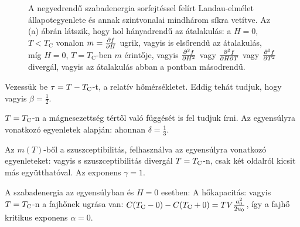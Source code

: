 \begin{figure}[ht!]
   \caption{A negyedrendű szabadenergia sorfejtéssel felírt Landau-elmélet  állapotegyenlete és annak szintvonalai mindhárom síkra vetítve. Az (a) ábrán látszik, hogy hol hányadrendű az átalakulás: a $H=0$, $T<T_\text{C}$ vonalon $m=\frac{\partial f}{\partial H}$ ugrik, vagyis is elsőrendű az átalakulás, míg $H=0$, $T=T_\text{C}$-ben $m$ érintője, vagyis $\frac{\partial ^2 f}{\partial H^2}$ vagy $\frac{\partial ^2 f}{\partial H\partial T}$ vagy $\frac{\partial ^2 f}{\partial T^2}$ divergál, vagyis az átalakulás abban a pontban másodrendű.}\label{fig:B10-landau}
  \end{figure}
  
  Vezessük be $\tau=T-T_\text{C}$-t, a relatív hőmérsékletet.
  Eddig tehát tudjuk, hogy
  vagyis $\beta=\frac{1}{2}$.
  
  $T=T_\text{C}$-n a mágnesezettség tértől való függését is fel tudjuk írni. Az egyensúlyra vonatkozó egyenletek alapján:
  ahonnan $\delta=\frac{1}{3}$.
  
  Az $m(T)$-ből a szuszceptibilitás, felhasználva az egyensúlyra vonatkozó egyenleteket:
  vagyis s szuszceptibilitás divergál $T=T_\text{C}$-n, csak két oldalról kicsit más együtthatóval. Az exponens $\gamma=1$. 
  
  A szabadenergia az egyensúlyban és $H=0$ esetben:
  A hőkapacitás:
  vagyis $T=T_\text{C}$-n a fajhőnek ugrása van: $C(T_\text{C}-0)-C(T_\text{C}+0)=TV\frac{a_0^2}{2u_0}$, így a fajhő kritikus exponens $\alpha=0$.
  
